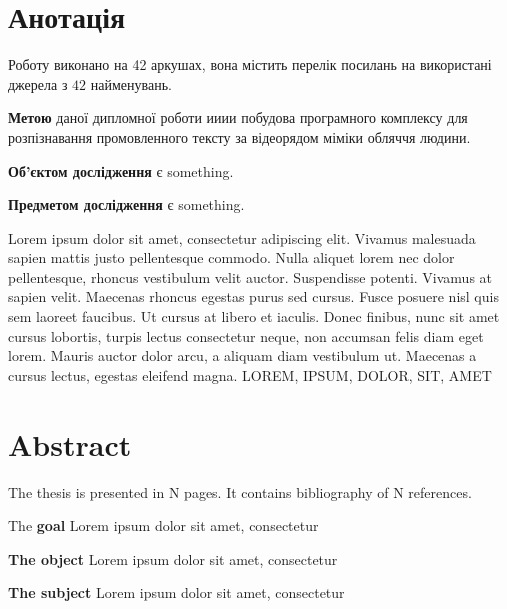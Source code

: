 \chapter*{Анотація}
\pagestyle{empty}
\thispagestyle{empty}

Роботу виконано на 42 аркушах, вона містить перелік посилань на використані джерела з $42$ найменувань.

\textbf{Метою} даної дипломної роботи ииии побудова програмного комплексу для розпізнавання промовленного тексту за відеорядом міміки обляччя людини.

\textbf{Об'єктом дослідження} є something.

\textbf{Предметом дослідження} є something.

Lorem ipsum dolor sit amet, consectetur adipiscing elit. Vivamus malesuada sapien mattis justo pellentesque commodo. Nulla aliquet lorem nec dolor pellentesque, rhoncus vestibulum velit auctor. Suspendisse potenti. Vivamus at sapien velit. Maecenas rhoncus egestas purus sed cursus. Fusce posuere nisl quis sem laoreet faucibus. Ut cursus at libero et iaculis. Donec finibus, nunc sit amet cursus lobortis, turpis lectus consectetur neque, non accumsan felis diam eget lorem. Mauris auctor dolor arcu, a aliquam diam vestibulum ut. Maecenas a cursus lectus, egestas eleifend magna. 
\MakeUppercase{Lorem, ipsum, dolor, sit, amet}

\chapter*{Abstract}
\thispagestyle{empty}
The thesis is presented in N pages. It contains bibliography of N references.


The \textbf{goal} Lorem ipsum dolor sit amet, consectetur

\textbf{The object} Lorem ipsum dolor sit amet, consectetur

\textbf{The subject} Lorem ipsum dolor sit amet, consectetur


